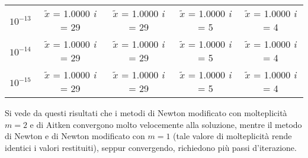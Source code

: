 \begin{center}
\begin{tabular}{|c|c|c|c|c|}
$10^{-13}$ & $\tilde{x}$ = 1.0000 \textit{i} = 29 & $\tilde{x}$ = 1.0000 \textit{i} = 29 & $\tilde{x}$ = 1.0000 \textit{i} = 5 & $\tilde{x}$ = 1.0000 \textit{i} = 4\\
$10^{-14}$ & $\tilde{x}$ = 1.0000 \textit{i} = 29 & $\tilde{x}$ = 1.0000 \textit{i} = 29 & $\tilde{x}$ = 1.0000 \textit{i} = 5 & $\tilde{x}$ = 1.0000 \textit{i} = 4\\
$10^{-15}$ & $\tilde{x}$ = 1.0000 \textit{i} = 29 & $\tilde{x}$ = 1.0000 \textit{i} = 29 & $\tilde{x}$ = 1.0000 \textit{i} = 5 & $\tilde{x}$ = 1.0000 \textit{i} = 4\\
\hline
\end{tabular}
\end{center}
Si vede da questi risultati che i metodi di Newton modificato con molteplicità $m=2$ e di Aitken convergono molto velocemente alla soluzione, mentre il metodo di Newton e di Newton modificato con $m=1$ (tale valore di molteplicità rende identici i valori restituiti), seppur convergendo, richiedono più passi d'iterazione.